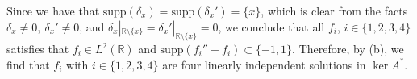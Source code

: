 \documentclass[a4paper,11pt]{article}
\newcommand{\euler}[1]{\text{e}^{#1}}
\newcommand{\supp}{\text{supp}}
\newcommand{\R}{\mathbb{R}}
\numberwithin{equation}{section}
\begin{document}
Since we have that $ \supp(\delta_x)=\supp(\delta_x')=\{x\} $, which is clear from the facts $ \delta_x\neq0,\ \delta_x'\neq 0 $, and $ \delta_x|_{\R\setminus\{x\}}=\delta_x'|_{\R\setminus\{x\}}=0 $, we conclude that all $ f_i $, $ i\in\{1,2,3,4\} $ satisfies that $ f_i\in L^2(\R) $ and $ \supp(f_i''-f_i)\subset \{-1,1\} $. Therefore, by (b), we find that $ f_i $ with $ i\in\{1,2,3,4\} $ are four linearly independent solutions in $ \ker A^* $.
\end{document}
